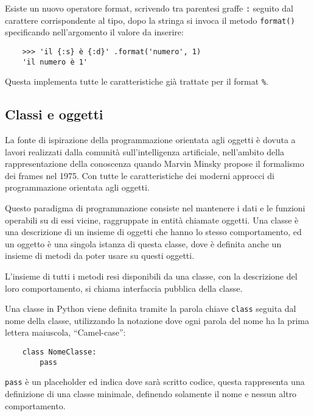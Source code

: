 \documentclass{article}
\numberwithin{equation}{subsection}
\begin{document}
Esiste un nuovo operatore format, scrivendo tra parentesi graffe \verb|:| seguito dal carattere corrispondente al tipo, dopo la stringa si invoca il metodo \verb|format()| 
specificando nell'argomento il valore da inserire:
\begin{verbatim}
    >>> 'il {:s} è {:d}' .format('numero', 1)
    'il numero è 1' 
\end{verbatim}
Questa implementa tutte le caratteristiche già trattate per il format \verb|%|. 

\subsection{Classi e oggetti}

La fonte di ispirazione della programmazione orientata agli oggetti è dovuta a lavori realizzati dalla comunità 
sull'intelligenza artificiale, nell'ambito della rappresentazione della conoscenza quando Marvin Minsky propose il 
formalismo dei frames nel 1975. Con tutte le caratteristiche dei moderni approcci di programmazione orientata agli 
oggetti. 

Questo paradigma di programmazione consiste nel mantenere i dati e le funzioni operabili su di essi vicine, raggruppate 
in entità chiamate oggetti. Una classe è una descrizione di un insieme di oggetti che hanno lo stesso comportamento, ed un 
oggetto è una singola istanza di questa classe, dove è definita anche un insieme di metodi da poter usare su questi oggetti. 

L'insieme di tutti i metodi resi disponibili da una classe, con la descrizione del loro comportamento, si chiama interfaccia 
pubblica della classe. 

Una classe in Python viene definita tramite la parola chiave \verb|class| seguita dal nome della classe, utilizzando 
la notazione dove ogni parola del nome ha la prima lettera maiuscola, ``Camel-case'':
\begin{verbatim}
    class NomeClasse:
        pass 
\end{verbatim}

\verb|pass| è un placeholder ed indica dove sarà scritto codice, questa rappresenta una definizione di una classe minimale, 
definendo solamente il nome e nessun altro comportamento. 
\end{document}
